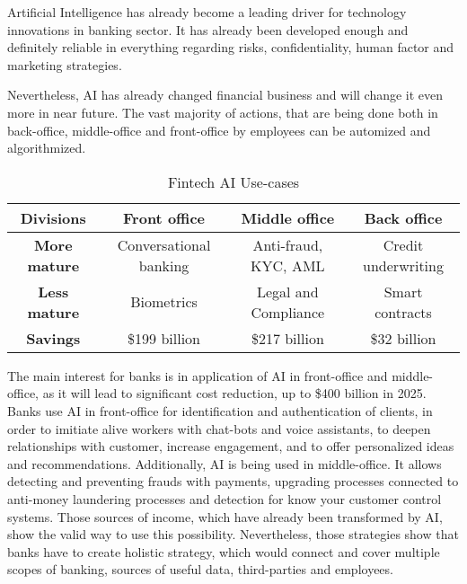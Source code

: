 



Artificial Intelligence has already become a leading driver for technology innovations in banking sector.
It has already been developed enough and definitely reliable in everything regarding risks, confidentiality, human factor and marketing strategies.

Nevertheless, AI has already changed financial business and will change it even more in near future.
The vast majority of actions, that are being done both in back-office, middle-office and front-office by employees can be automized and algorithmized.

\begin{table}
    \centering
    \caption{Fintech AI Use-cases}
    \begin{tabular}{| c | c | c | c |}
        \hline 
        \textbf{Divisions} &
            Front office & 
            Middle office & 
            Back office \\ \hline 
       
        \textbf{More mature} & 
            Conversational banking & 
            Anti-fraud, KYC, AML & 
            Credit underwriting \\ \hline 
       
        \textbf{Less mature} & 
            Biometrics & 
            Legal and Compliance &
            Smart contracts \\ \hline 
        \textbf{Savings} &
            \$199 billion &
            \$217 billion &
            \$32 billion \\
        \hline 
    \end{tabular}
    \medskip
\end{table}

The main interest for banks is in application of AI in front-office and middle-office, as it will lead to significant cost reduction, up to \$400 billion in 2025.
Banks use AI in front-office for identification and authentication of clients, in order to imitiate alive workers with chat-bots and voice assistants, to deepen relationships with customer, increase engagement, and to offer personalized ideas and recommendations.
Additionally, AI is being used in middle-office.
It allows detecting and preventing frauds with payments, upgrading processes connected to anti-money laundering processes and detection for know your customer control systems.
Those sources of income, which have already been transformed by AI, show the valid way to use this possibility.
Nevertheless, those strategies show that banks have to create holistic strategy, which would connect and cover multiple scopes of banking, sources of useful data, third-parties and employees.
\cite{autonomous_next}

